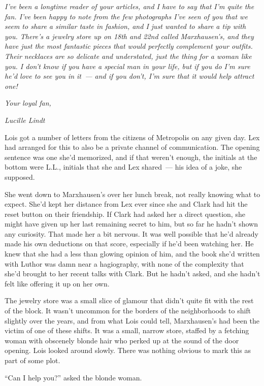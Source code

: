 \documentclass[ebook,12pt]{memoir}
\begin{document}
\emph{I've been a longtime reader of your articles, and I have to say
that I'm quite the fan. I've been happy to note from the few photographs
I've seen of you that we seem to share a similar taste in fashion, and I
just wanted to share a tip with you. There's a jewelry store up on 18th
and 22nd called Marxhausen's, and they have just the most fantastic
pieces that would perfectly complement your outfits. Their necklaces are
so delicate and understated, just the thing for a woman like you. I
don't know if you have a special man in your life, but if you do I'm
sure he'd love to see you in it~--- and if you don't, I'm sure that it
would help attract one!}

\emph{Your loyal fan,}

\emph{Lucille Lindt}

Lois got a number of letters from the citizens of Metropolis on any
given day. Lex had arranged for this to also be a private channel of
communication. The opening sentence was one she'd memorized, and if that
weren't enough, the initials at the bottom were L.L., initials that she
and Lex shared~--- his idea of a joke, she supposed.

She went down to Marxhausen's over her lunch break, not really knowing
what to expect. She'd kept her distance from Lex ever since she and
Clark had hit the reset button on their friendship. If Clark had asked
her a direct question, she might have given up her last remaining secret
to him, but so far he hadn't shown any curiosity. That made her a bit
nervous. It was well possible that he'd already made his own deductions
on that score, especially if he'd been watching her. He knew that she
had a less than glowing opinion of him, and the book she'd written with
Luthor was damn near a hagiography, with none of the complexity that
she'd brought to her recent talks with Clark. But he hadn't asked, and
she hadn't felt like offering it up on her own.

The jewelry store was a small slice of glamour that didn't quite fit
with the rest of the block. It wasn't uncommon for the borders of the
neighborhoods to shift slightly over the years, and from what Lois could
tell, Marxhausen's had been the victim of one of these shifts. It was a
small, narrow store, staffed by a fetching woman with obscenely blonde
hair who perked up at the sound of the door opening. Lois looked around
slowly. There was nothing obvious to mark this as part of some plot.

``Can I help you?'' asked the blonde woman.
\end{document}
